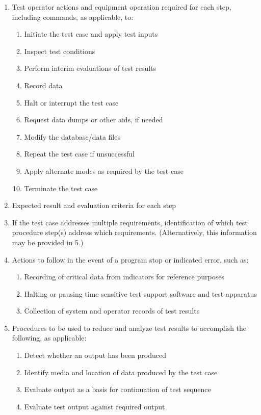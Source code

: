 \documentclass{fidata-report-template}
\begin{document}
\begin{enumerate}
\itemsep1pt\parskip0pt
\item
  Test operator actions and equipment operation required for each step,
  including commands, as applicable, to:

  \begin{enumerate}
  \itemsep1pt\parskip0pt
  \item
    Initiate the test case and apply test inputs
  \item
    Inspect test conditions
  \item
    Perform interim evaluations of test results
  \item
    Record data
  \item
    Halt or interrupt the test case
  \item
    Request data dumps or other aids, if needed
  \item
    Modify the database/data files
  \item
    Repeat the test case if unsuccessful
  \item
    Apply alternate modes as required by the test case
  \item
    Terminate the test case
  \end{enumerate}
\item
  Expected result and evaluation criteria for each step
\item
  If the test case addresses multiple requirements, identification of
  which test procedure step(s) address which requirements.
  (Alternatively, this information may be provided in 5.)
\item
  Actions to follow in the event of a program stop or indicated error,
  such as:

  \begin{enumerate}
  \itemsep1pt\parskip0pt
  \item
    Recording of critical data from indicators for reference purposes
  \item
    Halting or pausing time sensitive test support software and test
    apparatus
  \item
    Collection of system and operator records of test results
  \end{enumerate}
\item
  Procedures to be used to reduce and analyze test results to accomplish
  the following, as applicable:

  \begin{enumerate}
  \itemsep1pt\parskip0pt
  \item
    Detect whether an output has been produced
  \item
    Identify media and location of data produced by the test case
  \item
    Evaluate output as a basis for continuation of test sequence
  \item
    Evaluate test output against required output
  \end{enumerate}
\end{enumerate}
\end{document}
